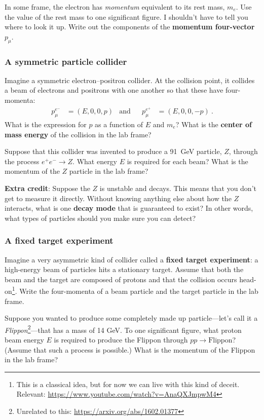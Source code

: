 \documentclass[12pt]{article}
\numberwithin{equation}{section}    %
\begin{document}
In some frame, the electron has \emph{momentum} equivalent to its rest mass, $m_e$. Use the value of the rest mass to one significant figure. I shouldn't have to tell you where to look it up. Write out the components of the \textbf{momentum four-vector} $p_\mu$. 

\subsubsection{A symmetric particle collider}

Imagine a symmetric electron--positron collider. At the collision point, it collides a beam of electrons and positrons with one another so that these have four-momenta:
\begin{align}
	p_\mu^{e^-} &= (E,0,0,p)
	&
	\text{and}
	&&
	p_\mu^{e^+} &= (E,0,0,-p) \ .
\end{align}
What is the expression for $p$ as a function of $E$ and $m_e$? What is the \textbf{center of mass energy} of the collision in the lab frame?

Suppose that this collider was invented to produce a 91~GeV particle, $Z$, through the process $e^+ e^- \to Z$. What energy $E$ is required for each beam? What is the momentum of the $Z$ particle in the lab frame?

\textbf{Extra credit}: Suppose the $Z$ is unstable and decays. This means that you don't get to measure it directly. Without knowing anything else about how the $Z$ interacts, what is one \textbf{decay mode} that is guaranteed to exist? In other words, what types of particles should you make sure you can detect? 

\subsubsection{A fixed target experiment}


Imagine a very asymmetric kind of collider called a \textbf{fixed target experiment}: a high-energy beam of particles hits a stationary target. Assume that both the beam and the target are composed of protons and that the collision occurs head-on\footnote{This is a classical idea, but for now we can live with this kind of deceit. Relevant: \url{https://www.youtube.com/watch?v=AnaQXJmpwM4}}. Write the four-momenta of a beam particle and the target particle in the lab frame. 

Suppose you wanted to produce some completely made up particle---let's call it a \emph{Flippon}\footnote{Unrelated to this: \url{https://arxiv.org/abs/1602.01377}}---that has a mass of 14 GeV. To one significant figure, what proton beam energy $E$ is required to produce the Flippon through $pp \to \text{Flippon}$? (Assume that such a process is possible.) What is the momentum of the Flippon in the lab frame?
\end{document}
